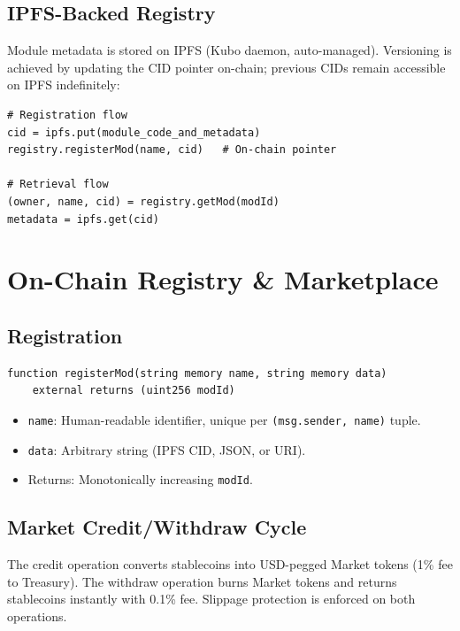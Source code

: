 \documentclass[11pt,a4paper]{article}
\begin{document}
\subsection{IPFS-Backed Registry}

Module metadata is stored on IPFS (Kubo daemon, auto-managed). Versioning is achieved by updating the CID pointer on-chain; previous CIDs remain accessible on IPFS indefinitely:

\begin{lstlisting}[style=python]
# Registration flow
cid = ipfs.put(module_code_and_metadata)
registry.registerMod(name, cid)   # On-chain pointer

# Retrieval flow
(owner, name, cid) = registry.getMod(modId)
metadata = ipfs.get(cid)
\end{lstlisting}

\section{On-Chain Registry \& Marketplace}
\label{sec:marketplace}

\subsection{Registration}

\begin{lstlisting}[style=solidity]
function registerMod(string memory name, string memory data)
    external returns (uint256 modId)
\end{lstlisting}

\begin{itemize}
    \item \texttt{name}: Human-readable identifier, unique per \texttt{(msg.sender, name)} tuple.
    \item \texttt{data}: Arbitrary string (IPFS CID, JSON, or URI).
    \item Returns: Monotonically increasing \texttt{modId}.
\end{itemize}

\subsection{Market Credit/Withdraw Cycle}

The credit operation converts stablecoins into USD-pegged Market tokens (1\% fee to Treasury). The withdraw operation burns Market tokens and returns stablecoins instantly with 0.1\% fee. Slippage protection is enforced on both operations.
\end{document}
